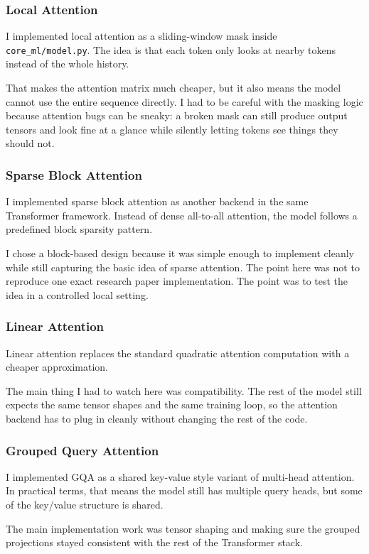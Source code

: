 \documentclass[11pt]{article}
\begin{document}
\subsubsection{Local Attention}
I implemented local attention as a sliding-window mask inside \texttt{core\_ml/model.py}. The idea is that each token only looks at nearby tokens instead of the whole history.

That makes the attention matrix much cheaper, but it also means the model cannot use the entire sequence directly. I had to be careful with the masking logic because attention bugs can be sneaky: a broken mask can still produce output tensors and look fine at a glance while silently letting tokens see things they should not.

\subsubsection{Sparse Block Attention}
I implemented sparse block attention as another backend in the same Transformer framework. Instead of dense all-to-all attention, the model follows a predefined block sparsity pattern.

I chose a block-based design because it was simple enough to implement cleanly while still capturing the basic idea of sparse attention. The point here was not to reproduce one exact research paper implementation. The point was to test the idea in a controlled local setting.

\subsubsection{Linear Attention}
Linear attention replaces the standard quadratic attention computation with a cheaper approximation.

The main thing I had to watch here was compatibility. The rest of the model still expects the same tensor shapes and the same training loop, so the attention backend has to plug in cleanly without changing the rest of the code.

\subsubsection{Grouped Query Attention}
I implemented GQA as a shared key-value style variant of multi-head attention. In practical terms, that means the model still has multiple query heads, but some of the key/value structure is shared.

The main implementation work was tensor shaping and making sure the grouped projections stayed consistent with the rest of the Transformer stack.
\end{document}
